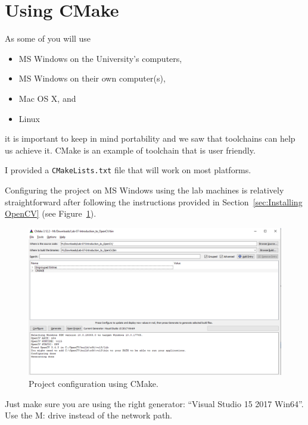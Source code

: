 \documentclass[english,a4paper,12pt,oneside]{article}
\begin{document}
\newpage


\section{Using CMake}

As some of you will use
\begin{itemize}
 \item MS Windows on the University's computers,
 \item MS Windows on their own computer(s),
 \item Mac OS X, and
 \item Linux
\end{itemize}
it is important to keep in mind portability and we saw that toolchains can help us achieve it. 
CMake is an example of toolchain that is user friendly. 

I provided a \verb+CMakeLists.txt+ file that will work on most platforms. 


Configuring the project on MS Windows using the lab machines is relatively straightforward after following the instructions provided in Section~\ref{sec:Installing OpenCV} (see Figure~\ref{fig:config proj}). 
	\begin{figure}[tbhp]
	\includegraphics[width=\textwidth]{cmake}
	\caption{\label{fig:config proj}Project configuration using CMake.}
\end{figure}

{\Large Just make sure you are using the right generator: ``Visual Studio 15 2017 Win64''.}\\

{\Large Use the M: drive instead of the network path.}


\newpage
\end{document}
